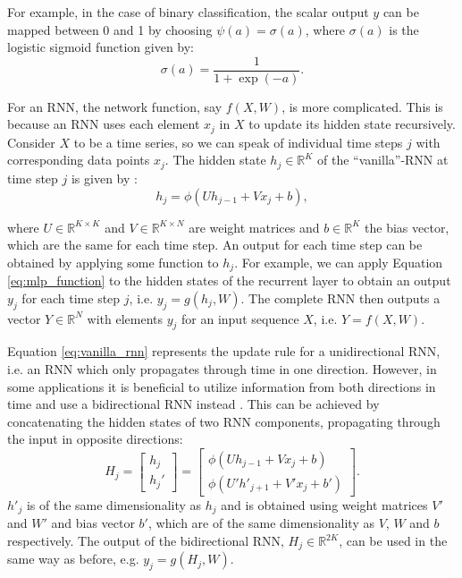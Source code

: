\noindent For example, in the case of binary classification, the scalar output $y$ can be mapped between 0 and 1 by choosing 
$\psi(a) = \sigma(a)$, where $\sigma(a)$ is the logistic sigmoid function given by:
\begin{equation}
    \sigma(a) = \frac{1}{1+\exp(-a)}.
\end{equation}

For an RNN, the network function, say $f(X,W)$, is more complicated. This is because an RNN uses each element $x_j$ in $X$ to update its hidden state recursively. Consider $X$ to be a time series, so we can speak of individual time steps $j$ with corresponding data points $x_j$. The hidden state $h_{j} \in \mathbb{R}^K$ of the ``vanilla''-RNN at time step $j$ is given by \citep{yu2019review}: 
\begin{equation}
    \label{eq:vanilla_rnn}
    h_{j} = \phi(U h_{j-1} + V x_j + b),
\end{equation}

\noindent where $U \in \mathbb{R}^{K \times K}$ and $V \in \mathbb{R}^{K \times N}$ are weight matrices and $b \in \mathbb{R}^{K}$ the bias vector, which are the same for each time step. An output for each time step can be obtained by applying some function to $h_{j}$. For example, we can apply Equation \ref{eq:mlp_function} to the hidden states of the recurrent layer to obtain an output $y_j$ for each time step $j$, i.e. $y_j= g(h_{j}, W)$. The complete RNN then outputs a vector $Y \in \mathbb{R}^N$ with elements $y_j$ for an input sequence $X$, i.e. $Y = f(X, W)$.

Equation \ref{eq:vanilla_rnn} represents the update rule for a unidirectional RNN, i.e. an RNN which only propagates through time in one direction. However, in some applications it is beneficial to utilize information from both directions in time and use a bidirectional RNN instead \citep{schuster1997bidirectional}. This can be achieved by concatenating the hidden states of two RNN components, propagating through the input in opposite directions:
\begin{equation}
    H_j =  
    \begin{bmatrix}
        h_j \\
        h_j'
    \end{bmatrix} =
    \begin{bmatrix}
        \phi(U h_{j-1} + V x_j + b) \\
        \phi(U' h'_{j+1} + V' x_j + b')
    \end{bmatrix}.
\end{equation}
$h'_j$ is of the same dimensionality as $h_j$ and is obtained using weight matrices $V'$ and $W'$ and bias vector $b'$, which are of the same dimensionality as $V$, $W$ and $b$ respectively. The output of the bidirectional RNN, $H_j \in \mathbb{R}^{2K}$, can be used in the same way as before, e.g. $y_j= g(H_{j}, W)$.

